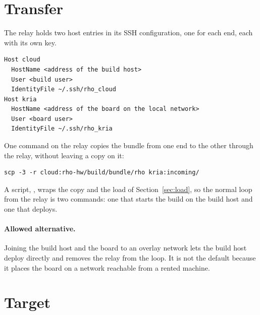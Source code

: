 \section{Transfer}\label{sec:transfer}

The relay holds two host entries in its SSH configuration, one for each end,
each with its own key.
\begin{lstlisting}
Host cloud
  HostName <address of the build host>
  User <build user>
  IdentityFile ~/.ssh/rho_cloud
Host kria
  HostName <address of the board on the local network>
  User <board user>
  IdentityFile ~/.ssh/rho_kria
\end{lstlisting}

One command on the relay copies the bundle from one end to the other through
the relay, without leaving a copy on it:
\begin{lstlisting}
scp -3 -r cloud:rho-hw/build/bundle/rho kria:incoming/
\end{lstlisting}
A script, , wraps the copy and the load of
Section~\ref{sec:load}, so the normal loop from the relay is two commands:
one that starts the build on the build host and one that deploys.

\paragraph{Allowed alternative.} Joining the build host and the board to an
overlay network lets the build host deploy directly and removes the relay
from the loop. It is not the default because it places the board on a
network reachable from a rented machine.

\section{Target}\label{sec:target}

